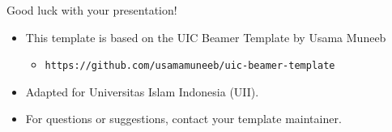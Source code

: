 \begin{frame}[fragile]{Good luck with your presentation!}
\begin{itemize}
\item This template is based on the UIC Beamer Template by Usama Muneeb
    \begin{itemize}
    \item  \verb|https://github.com/usamamuneeb/uic-beamer-template|
    \end{itemize}
\item Adapted for Universitas Islam Indonesia (UII).
\item For questions or suggestions, contact your template maintainer.
\end{itemize}
\end{frame}